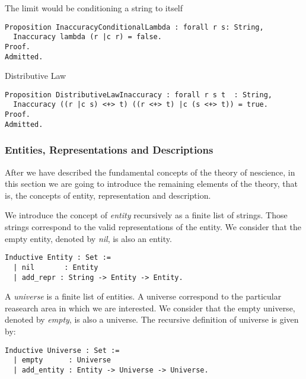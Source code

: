 {\color{red}  The limit would be conditioning a string to itself}

\begin{sourcecode}
{\scriptsize \begin{verbatim}
Proposition InaccuracyConditionalLambda : forall r s: String, 
  Inaccuracy lambda (r |c r) = false.
Proof.
Admitted.
\end{verbatim}}
\end{sourcecode}

{\color{red} Distributive Law}

\begin{sourcecode}
{\scriptsize \begin{verbatim}
Proposition DistributiveLawInaccuracy : forall r s t  : String,
  Inaccuracy ((r |c s) <+> t) ((r <+> t) |c (s <+> t)) = true.
Proof.
Admitted.
\end{verbatim}}
\end{sourcecode}


\subsubsection*{Entities, Representations and Descriptions}

After we have described the fundamental concepts of the theory of nescience, in this section we are going to introduce the remaining elements of the theory, that is, the concepts of entity, representation and description.

We introduce the concept of \emph{entity} recursively as a finite list of strings. Those strings correspond to the valid representations of the entity. We consider that the empty entity, denoted by \emph{nil}, is also an entity.

\begin{sourcecode}
{\scriptsize \begin{verbatim}
Inductive Entity : Set :=
  | nil       : Entity
  | add_repr : String -> Entity -> Entity.
\end{verbatim}}
\end{sourcecode}

A \emph{universe} is a finite list of entities. A universe correspond to the particular reasearch area in which we are interested. We consider that the empty universe, denoted by \emph{empty}, is also a universe. The recursive definition of universe is given by:

\begin{sourcecode}
{\scriptsize \begin{verbatim}
Inductive Universe : Set :=
  | empty      : Universe
  | add_entity : Entity -> Universe -> Universe.
\end{verbatim}}
\end{sourcecode}

